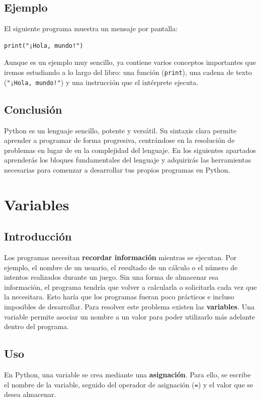 \documentclass[11pt,a5paper,twoside]{book}
\begin{document}
\subsection{Ejemplo}
El siguiente programa muestra un mensaje por pantalla:


\begin{tcolorbox}
\scriptsize
 \begin{verbatim}
print("¡Hola, mundo!")
\end{verbatim}
\end{tcolorbox}
Aunque es un ejemplo muy sencillo, ya contiene varios conceptos importantes que iremos estudiando a lo largo del libro: una función ({\scriptsize \texttt{print}}), una cadena de texto ({\scriptsize \texttt{"¡Hola, mundo!"}}) y una instrucción que el intérprete ejecuta.
\subsection{Conclusión}
Python es un lenguaje sencillo, potente y versátil. Su sintaxis clara permite aprender a programar de forma progresiva, centrándose en la resolución de problemas en lugar de en la complejidad del lenguaje.
En los siguientes apartados aprenderás los bloques fundamentales del lenguaje y adquirirás las herramientas necesarias para comenzar a desarrollar tus propios programas en Python.

\newpage

\section{Variables}
\subsection{Introducción}
Los programas necesitan \textbf{recordar información} mientras se ejecutan. Por ejemplo, el nombre de un usuario, el resultado de un cálculo o el número de intentos realizados durante un juego.
Sin una forma de almacenar esa información, el programa tendría que volver a calcularla o solicitarla cada vez que la necesitara. Esto haría que los programas fueran poco prácticos e incluso imposibles de desarrollar.
Para resolver este problema existen las \textbf{variables}. Una variable permite asociar un nombre a un valor para poder utilizarlo más adelante dentro del programa.
\subsection{Uso}
En Python, una variable se crea mediante una \textbf{asignación}. Para ello, se escribe el nombre de la variable, seguido del operador de asignación ({\scriptsize \texttt{=}}) y el valor que se desea almacenar.
\end{document}
